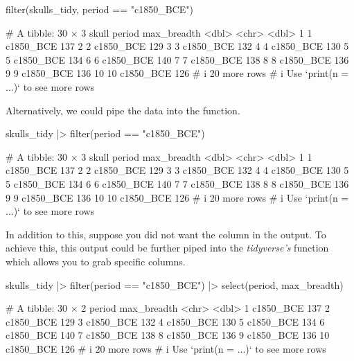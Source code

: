 \begin{inR}
filter(skulls_tidy, period == "c1850_BCE")
\end{inR}
\begin{outR}
# A tibble: 30 × 3
   skull period    max_breadth
   <dbl> <chr>           <dbl>
 1     1 c1850_BCE         137
 2     2 c1850_BCE         129
 3     3 c1850_BCE         132
 4     4 c1850_BCE         130
 5     5 c1850_BCE         134
 6     6 c1850_BCE         140
 7     7 c1850_BCE         138
 8     8 c1850_BCE         136
 9     9 c1850_BCE         136
10    10 c1850_BCE         126
# i 20 more rows
# i Use `print(n = ...)` to see more rows
\end{outR}

\noindent
Alternatively, we could pipe the data into the  function.

\begin{inR}
skulls_tidy |> filter(period == "c1850_BCE")
\end{inR}
\begin{outR}
# A tibble: 30 × 3
   skull period    max_breadth
   <dbl> <chr>           <dbl>
 1     1 c1850_BCE         137
 2     2 c1850_BCE         129
 3     3 c1850_BCE         132
 4     4 c1850_BCE         130
 5     5 c1850_BCE         134
 6     6 c1850_BCE         140
 7     7 c1850_BCE         138
 8     8 c1850_BCE         136
 9     9 c1850_BCE         136
10    10 c1850_BCE         126
# i 20 more rows
# i Use `print(n = ...)` to see more rows
\end{outR}

In addition to this, suppose you did not want the  column in the output. To achieve this, this output could be further piped into the \textit{tidyverse's}  function which allows you to grab specific columns.

\begin{inR}
skulls_tidy |> 
  filter(period == "c1850_BCE") |> 
  select(period, max_breadth)
\end{inR}
\begin{outR}
# A tibble: 30 × 2
   period    max_breadth
   <chr>           <dbl>
 1 c1850_BCE         137
 2 c1850_BCE         129
 3 c1850_BCE         132
 4 c1850_BCE         130
 5 c1850_BCE         134
 6 c1850_BCE         140
 7 c1850_BCE         138
 8 c1850_BCE         136
 9 c1850_BCE         136
10 c1850_BCE         126
# i 20 more rows
# i Use `print(n = ...)` to see more rows
\end{outR}

